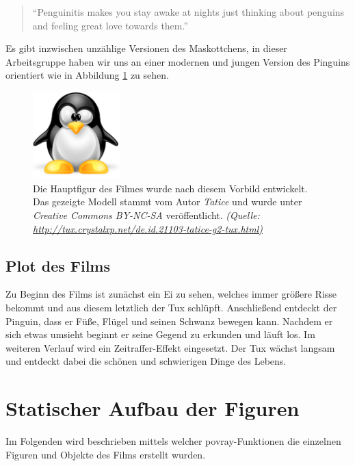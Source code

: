 \documentclass[11pt,parskip]{scrartcl}
\begin{document}
\begin{quote}
  \enquote{Penguinitis makes you stay awake at nights just thinking about
    penguins and feeling great love towards them.} \cite{tuxstory}
\end{quote}

Es gibt inzwischen unzählige Versionen des Maskottchens, in dieser
Arbeitsgruppe haben wir uns an einer modernen und jungen Version des Pinguins
orientiert wie in Abbildung \ref{fig:taticetux} zu sehen.

\begin{figure}[htbp]
  \centering
  \includegraphics[width=0.3\textwidth]{./fig/tatice-g2-tux.pdf}
  \caption{
    Die Hauptfigur des Filmes wurde nach diesem Vorbild entwickelt. Das
    gezeigte Modell stammt vom Autor \emph{Tatice} und wurde unter
    \emph{Creative Commons BY-NC-SA} veröffentlicht.
    \emph{
      (Quelle: \url{http://tux.crystalxp.net/de.id.21103-tatice-g2-tux.html)}
    }
  }
  \label{fig:taticetux}
\end{figure}


\subsection{Plot des Films}
Zu Beginn des Films ist zunächst ein Ei zu sehen, welches immer größere Risse
bekommt und aus diesem letztlich der Tux schlüpft. Anschließend entdeckt der
Pinguin, dass er Füße, Flügel und seinen Schwanz bewegen kann. Nachdem er sich
etwas umsieht beginnt er seine Gegend zu erkunden und läuft los. Im weiteren
Verlauf wird ein Zeitraffer-Effekt eingesetzt. Der Tux wächst langsam und
entdeckt dabei die schönen und schwierigen Dinge des Lebens.


\newpage

\section{Statischer Aufbau der Figuren}
Im Folgenden wird beschrieben mittels welcher povray-Funktionen die einzelnen
Figuren und Objekte des Films erstellt wurden.
\end{document}
